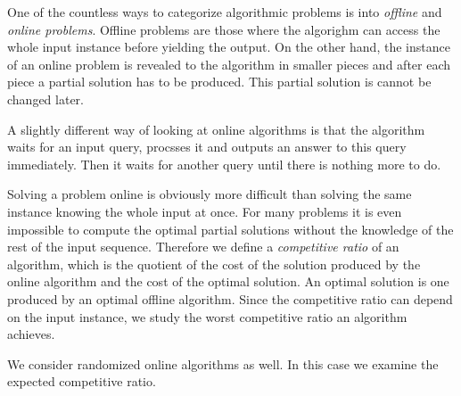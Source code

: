 One of the countless ways to categorize algorithmic problems is into
\emph{offline} and \emph{online problems}. Offline problems are those
where the algorighm can access the whole input instance before yielding
the output.  On the other hand, the instance of an online problem is
revealed to the algorithm in smaller pieces and after each piece a partial
solution has to be produced. This partial solution is cannot be changed
later.

A slightly different way of looking at online algorithms is that the
algorithm waits for an input query, procsses it and outputs an answer to
this query immediately. Then it waits for another query until there is
nothing more to do.

Solving a problem online is obviously more difficult than solving the same
instance knowing the whole input at once. For many problems it is even
impossible to compute the optimal partial solutions without the knowledge
of the rest of the input sequence. Therefore we define a \emph{competitive
ratio} of an algorithm, which is the quotient of the cost of the solution
produced by the online algorithm and the cost of the optimal solution. An
optimal solution is one produced by an optimal offline algorithm. Since
the competitive ratio can depend on the input instance, we study the worst
competitive ratio an algorithm achieves.

We consider randomized online algorithms as well. In this case we examine
the expected competitive ratio.

